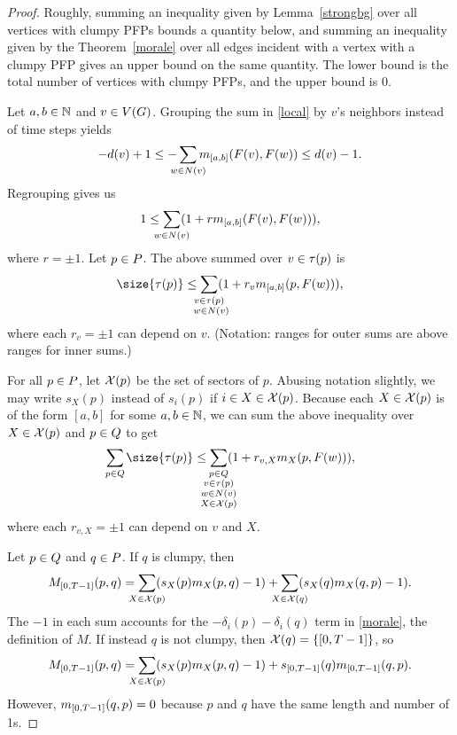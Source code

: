 \begin{proof}
Roughly, summing an inequality given by Lemma~\ref{strongbg} over all vertices
with clumpy PFPs bounds a quantity below, and summing an
inequality given by the Theorem~\ref{morale} over all edges incident with a
vertex with a clumpy PFP gives an upper bound on the same quantity. The lower
bound is the total number of vertices with clumpy PFPs, and the upper bound is
0.

Let $a,b \in \mathbb{N}$ and $v \in V(G)$. Grouping the sum in \eqref{local} by $v$'s
neighbors instead of time steps yields
\[
  -\deg{v} + 1 \leq -\smashoperator{\sum_{w \in
      \N{v}}}\misb{[a,b]}{\pfp{v}}{\pfp{w}} \leq \deg{v} - 1.
\]
Regrouping gives us
\[
  1 \leq \smashoperator{\sum_{w \in \N{v}}}(1 +
  r\misb{[a,b]}{\pfp{v}}{\pfp{w}}),
\]
where $r = \pm1$. Let $p \in \pfps$. The above summed over $v \in \pfpverts{p}$
is
\[
  \size{\pfpverts{p}} \leq \smashoperator{\sum_{\substack{v \in \pfpverts{p}
        \\\ w \in \N{v}}}}(1 + r_v\misb{[a,b]}{p}{\pfp{w}}),
\]
where each $r_v = \pm1$ can depend on $v$. (Notation: ranges for outer sums are
above ranges for inner sums.)

For all $p \in \pfps$, let $\mathcal{X}(p)$ be the set of sectors of $p$. Abusing
notation slightly, we may write $s_X(p)$ instead of $s_i(p)$ if $i \in X \in
\mathcal{X}(p)$. Because each $X \in \mathcal{X}(p)$ is of the form $[a,b]$ for some $a,b
\in \mathbb{N}$, we can sum the above inequality over $X \in \mathcal{X}(p)$ and $p \in
\cpfps$ to get
\begin{equation}\label{almost}
  \smashoperator[r]{\sum_{p \in \cpfps}}\size{\pfpverts{p}} \leq
  \smashoperator{\sum_{\substack{
        p \in \cpfps \\ v \in \pfpverts{p} \\
        w \in \N{v} \\ X \in \sctr{p}
  }}}(1 + r_{v,X}\misb{X}{p}{\pfp{w}}),
\end{equation}
where each $r_{v,X} = \pm1$ can depend on $v$ and $X$.

Let $p \in \cpfps$ and $q \in \pfps$. If $q$ is clumpy, then
\[
  M_{[0,\period-1]}(p,q) =
  \smashoperator{\sum_{X \in \sctr{p}}}(s_X(p)\misb{X}{p}{q} - 1) +
  \smashoperator{\sum_{X \in \sctr{q}}}(s_X(q)\misb{X}{q}{p} - 1).
\]
The $-1$ in each sum accounts for the $-\delta_i(p)-\delta_i(q)$ term in
\eqref{morale}, the definition of $M$. If instead $q$ is not clumpy, then
$\sctr{q} = \{[0,\period-1]\}$, so
\[
  M_{[0,\period-1]}(p,q) =
  \smashoperator{\sum_{X \in \sctr{p}}}(s_X(p)\misb{X}{p}{q} - 1) +
  s_{[0,\period-1]}(q)\misb{[0,\period-1]}{q}{p}.
\]
However, $\misb{[0,\period-1]}{q}{p} = 0$ because $p$ and $q$ have the same
length and number of 1s.


\end{proof}
